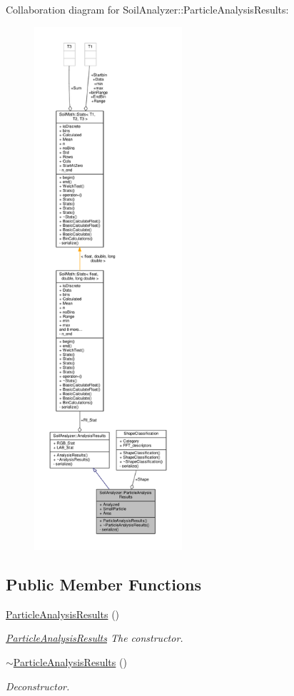 Collaboration diagram for Soil\+Analyzer\+:\+:Particle\+Analysis\+Results\+:\nopagebreak
\begin{figure}[H]
\begin{center}
\leavevmode
\includegraphics[height=550pt]{class_soil_analyzer_1_1_particle_analysis_results__coll__graph}
\end{center}
\end{figure}
\subsection*{Public Member Functions}
\begin{DoxyCompactItemize}
\item 
\hyperlink{class_soil_analyzer_1_1_particle_analysis_results_a5107ea5aae70deadb77ab22c2429f7f6}{Particle\+Analysis\+Results} ()
\begin{DoxyCompactList}\small\item\em \hyperlink{class_soil_analyzer_1_1_particle_analysis_results}{Particle\+Analysis\+Results} The constructor. \end{DoxyCompactList}\item 
\hyperlink{class_soil_analyzer_1_1_particle_analysis_results_aac752bb68987b0d4e78d506c68a1ebeb}{$\sim$\+Particle\+Analysis\+Results} ()
\begin{DoxyCompactList}\small\item\em Deconstructor. \end{DoxyCompactList}\end{DoxyCompactItemize}
